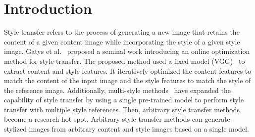 \documentclass[times,twocolumn,final,authoryear]{elsarticle}
\begin{document}
\section{Introduction}
Style transfer refers to the process of generating a new image that retains the content of a given content image while incorporating the style of a given style image.
Gatys et al.~\citep{gatys2015neural,cai2023image} proposed a seminal work introducing an online optimization method for style transfer. The proposed method used a fixed model (VGG)~\citep{simonyan2014very} to extract content and style features. It iteratively optimized the content features to match the content of the input image and the style features to match the style of the reference image. Additionally, multi-style methods~\citep{dumoulin2016learned,chen2017stylebank} have expanded the capability of style transfer by using a single pre-trained model to perform style transfer with multiple style references.
Then, arbitrary style transfer methods~\citep {huang2017arbitrary} become a research hot spot. Arbitrary style transfer methods can generate stylized images from arbitrary content and style images based on a single model. 
\end{document}
